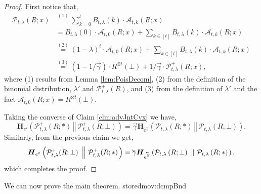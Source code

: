 \documentclass{article}
\newcommand{\showstored}[1]{\csname stored#1\endcsname}
\newcommand{\NeurIPS}[1]{#1}
\newcommand{\NeurIPS}[1]{}
\theoremstyle{plain}
\theoremstyle{definition}
\newcommand{\eps}{\varepsilon}
\newcommand{\eqExp}[2]{\overset{(#1)}{#2}}
\newcommand{\lvec}[1]{\reflectbox{$\vec{\reflectbox{$#1$}}$}}
\newcommand{\rand}{R}
\newcommand{\HockeyStick}[1]{\boldsymbol{H}_{#1}}
\newcommand{\HockeyStickDiv}[3]{\HockeyStick{#1}\left(#2 ~\left\Vert~ #3 \right. \right)}
\newcommand{\PoisFunc}[3]{\mathcal{P}_{#1}\left(#2; #3\right)}
\newcommand{\allocFunc}[3]{\mathcal{A}_{#1}\left(#2; #3\right)}
\newcommand{\add}[1]{\lvec{#1}}
\newcommand{\rem}[1]{\vec{#1}}
\begin{document}
\begin{proof}
    First notice that, 
    \begin{align*}
        \PoisFunc{t, \lambda}{\rand}{x} & \eqExp{1}{=} \sum_{k = 0}^{t} B_{t, \lambda}(k) \cdot \allocFunc{t, k}{\rand}{x}
        \\ & = B_{t, \lambda}(0) \cdot \allocFunc{t, 0}{\rand}{x} + \sum_{k \in [t]} B_{t, \lambda}(k) \cdot \allocFunc{t, k}{\rand}{x}
        \\ & \eqExp{2}{=} \left(1 - \lambda \right)^{t} \cdot \allocFunc{t, 0}{\rand}{x} + \sum_{k \in [t]} B_{t, \lambda}(k) \cdot \allocFunc{t, k}{\rand}{x}
        \\ & \eqExp{3}{=} (1 - 1/\rem{\gamma}) \cdot \rand^{\otimes t}(\bot) + 1/\rem{\gamma} \cdot \mathcal{P}_{t, \lambda}^{+}(\rand; x),
    \end{align*}
    where (1) results from Lemma \ref{lem:PoisDecom}, (2) from the definition of the binomial distribution, $\lambda'$ and $\mathcal{P}_{t, \lambda}^{+}(\rand)$, and (3) from the definition of $\lambda'$ and the fact $\allocFunc{t, 0}{\rand}{x} = \rand^{\otimes t}(\bot)$.

    Taking the converse of Claim \ref{clm:advJntCvx} we have, 
    \[
        \HockeyStickDiv{e^{\eps}}{\mathcal{P}_{t, \lambda}^{+}(\rand; *)}{\mathcal{P}_{t, \lambda}^{+}(\rand; \bot)} = \rem{\gamma} \HockeyStickDiv{e^{\rem{\eps}}}{\PoisFunc{t, \lambda}{\rand}{*}}{\PoisFunc{t, \lambda}{\rand}{\bot}}.
    \]
    Similarly, from the previous claim we get,
    \[
        \HockeyStickDiv{e^{\eps}}{\mathcal{P}_{t, \lambda}^{+}(\rand; \bot)}{\mathcal{P}_{t, \lambda}^{+}(\rand; *)} = \add{\gamma} \HockeyStickDiv{e^{\add{\eps}}}{\PoisFunc{t, \lambda}{\rand}{\bot}}{\PoisFunc{t, \lambda}{\rand}{*}}.
    \]    
    which completes the proof.
\end{proof}

\NeurIPS{We can now prove the main theorem.}
\showstored{mov:dcmpBnd}
\end{document}

